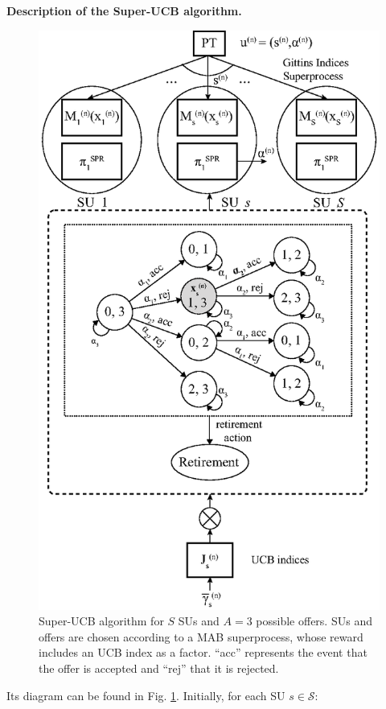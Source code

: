 \textbf{Description of the Super-UCB algorithm.}
\begin{figure}[!t]
\centering
\includegraphics[scale=0.8]{esquemaSuper.eps}
\caption{Super-UCB algorithm for $S$ SUs and $A=3$ possible offers. SUs and offers are chosen according to a MAB superprocess, whose reward includes an UCB index as a factor. ``acc'' represents the event that the offer is accepted and ``rej'' that it is rejected.}
\label{fig:esquemaSuper}
\end{figure}
Its diagram can be found in Fig. \ref{fig:esquemaSuper}. Initially, for each SU $s \in \mathcal{S}$:
